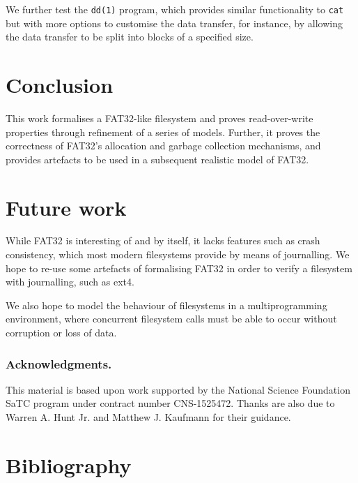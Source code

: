 \documentclass[submission,copyright,creativecommons]{eptcs}
\begin{document}
We further test the \texttt{dd(1)} program, which provides similar
functionality to \texttt{cat} but with more options to customise the
data transfer, for instance, by allowing the data transfer to be split
into blocks of a specified size.

\section{Conclusion}

This work formalises a FAT32-like filesystem and proves
read-over-write properties through refinement of a series of
models. Further, it proves the correctness of FAT32's allocation and
garbage collection mechanisms, and provides artefacts to be used in a
subsequent realistic model of FAT32.

\section{Future work}

While FAT32 is interesting of and by itself, it lacks features such as
crash consistency, which most modern filesystems provide by means of
journalling. We hope to re-use some artefacts of formalising FAT32 in
order to verify a filesystem with journalling, such as ext4.

We also hope to model the behaviour of filesystems in a
multiprogramming environment, where concurrent filesystem calls must
be able to occur without corruption or loss of data.

\subsubsection*{Acknowledgments.} This material is based upon work
supported by the National Science Foundation SaTC program under
contract number CNS-1525472. Thanks are also due to Warren A. Hunt
Jr. and Matthew J. Kaufmann for their guidance.

\section{Bibliography}



\end{document}
